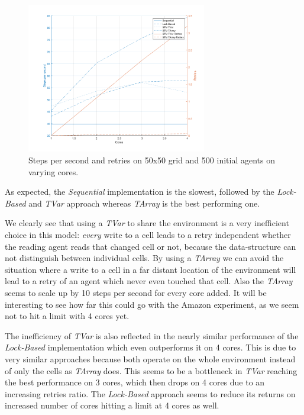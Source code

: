 \begin{figure}
	\centering
	\includegraphics[width=0.7\textwidth, angle=0]{./fig/concurrentabs/sugarscape/varying_cores.png}
	\caption{Steps per second and retries on 50x50 grid and 500 initial agents on varying cores.}
	\label{fig:varying_cores}
\end{figure}

As expected, the \textit{Sequential} implementation is the slowest, followed by the \textit{Lock-Based} and \textit{TVar} approach whereas \textit{TArray} is the best performing one.

We clearly see that using a \textit{TVar} to share the environment is a very inefficient choice in this model: \textit{every} write to a cell leads to a retry independent whether the reading agent reads that changed cell or not, because the data-structure can not distinguish between individual cells. By using a \textit{TArray} we can avoid the situation where a write to a cell in a far distant location of the environment will lead to a retry of an agent which never even touched that cell. Also the \textit{TArray} seems to scale up by 10 steps per second for every core added. It will be interesting to see how far this could go with the Amazon experiment, as we seem not to hit a limit with 4 cores yet.

The inefficiency of \textit{TVar} is also reflected in the nearly similar performance of the \textit{Lock-Based} implementation which even outperforms it on 4 cores. This is due to very similar approaches because both operate on the whole environment instead of only the cells as \textit{TArray} does. This seems to be a bottleneck in \textit{TVar} reaching the best performance on 3 cores, which then drops on 4 cores due to an increasing retries ratio. The \textit{Lock-Based} approach seems to reduce its returns on increased number of cores hitting a limit at 4 cores as well.

